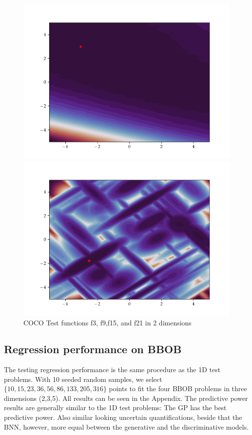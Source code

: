 \begin{figure}[h]
\begin{minipage}[b]{0.24\textwidth}
    \includegraphics[trim=2.5cm 1.3cm 2.5cm 1.3cm,clip,width=\textwidth]{Figures/coco/f15.png}
  \end{minipage}
  \hfill
  \begin{minipage}[b]{0.24\textwidth}
    \includegraphics[trim=2.5cm 1.3cm 2.5cm 1.3cm,clip,width=\textwidth]{Figures/coco/f21.png}
  \end{minipage}
  
  \caption{COCO Test functions f3, f9,f15, and f21 in 2 dimensions}
  \label{COCO_tests}
\end{figure}

\subsection{Regression performance on BBOB}\label{BBOB_reg}
The testing regression performance is the same procedure as the 1D test problems. With 10 seeded
random samples, we select $\{10, 15, 23, 36, 56, 86, 133, 205, 316\}$ points to fit the four BBOB
problems in three dimensions (2,3,5). All results can be seen in the Appendix. The predictive power
results are generally similar to the 1D test problems: The GP has the best predictive power. Also
similar looking uncertain quantifications, beside that the BNN, however, more equal between the
generative and the discriminative models. 

